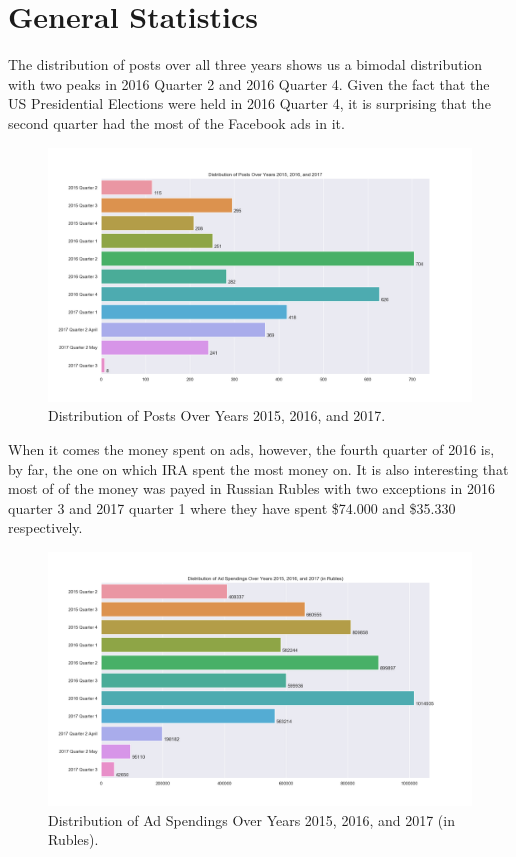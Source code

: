 \documentclass[11pt]{article}
\theoremstyle{definition}
\begin{document}

\section*{\centering General Statistics}
The distribution of posts over all three years shows us a bimodal distribution
with two peaks in 2016 Quarter 2 and 2016 Quarter 4. Given the fact that the US
Presidential Elections were held in 2016 Quarter 4, it is surprising that the
second quarter had the most of the Facebook ads in it.

\begin{figure}[H]
\centering
\includegraphics[width=\textwidth]{../visualization/barchart-plots/barchart_distribution_of_posts.png}
\caption*{Distribution of Posts Over Years 2015, 2016, and 2017.}
\end{figure}

When it comes the money spent on ads, however, the fourth quarter of 2016 is,
by far, the one on which IRA spent the most money on. It is also interesting
that most of of the money was payed in Russian Rubles with two exceptions in
2016 quarter 3 and 2017 quarter 1 where they have spent \$74.000 and \$35.330
respectively.

\begin{figure}[H]
\centering
\includegraphics[width=\textwidth]{../visualization/barchart-plots/barchart_ad_spend_RU_distribution.png}
\caption*{Distribution of Ad Spendings Over Years 2015, 2016, and 2017 (in Rubles).}
\end{figure}
\end{document}
